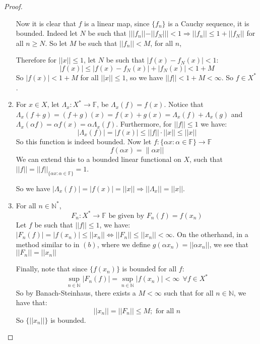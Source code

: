 \documentclass{article}
\newcommand{\N}{\mathbb{N}}
\theoremstyle{definition}
\theoremstyle{remark}
\theoremstyle{definition}
\begin{document}
\begin{proof}
\begin{enumerate}[label = (\alph*)]
    Now it is clear that $f$ is a linear map, since $\{f_n\}$ is a Cauchy sequence, it is bounded. Indeed let $N$
 be such that $|||f_n|| - ||f_N|| |< 1 \Rightarrow ||f_n|| \leq 1+||f_N||$ for all $n\geq N$.
So let $M$ be such that $||f_n||<M$, for all $n$,


Therefore for $||x||\leq 1$, let $N$ be such that $|f(x)-f_N(x)|<1$:\begin{equation}
    |f(x)|\leq |f(x)-f_N(x)|+|f_N(x)| <1+M
\end{equation}
So $|f(x)|<1+M$ for all $||x||\leq 1$, so we have $||f||<1+M<\infty$. So $f\in X^\ast$.

\item For $x\in X$, let $\Lambda_x \colon X^\ast\rightarrow \mathbb{F}$, be $\Lambda_x(f) = f(x)$. 
Notice that $\Lambda_x(f+g) = (f+g)(x) = f(x)+g(x) = \Lambda_x(f)+\Lambda_x(g)$ and $\Lambda_x(\alpha f) = \alpha f(x) = \alpha \Lambda_x(f)$.
Furthermore, for $||f||\leq 1$ we have:\begin{equation}
    |\Lambda_x(f)| = |f(x)| \leq ||f||\cdot ||x|| \leq ||x||
\end{equation}
So this function is indeed bounded. Now let $f\colon \{\alpha x\colon \alpha\in \mathbb{F}\} \rightarrow \mathbb{F}$ \begin{equation}
    f(\alpha x) = \|\alpha x||
\end{equation}
We can extend this to a bounded linear functional on $X$, such that $||f|| = ||f||_{\{\alpha x\colon \alpha\in \mathbb{F}\}} = 1$. 

So we have $|\Lambda_x(f)| = |f(x)| = ||x|| \Rightarrow ||\Lambda_x|| = ||x||$.

\item For all $n\in \N^\ast$, \begin{equation}
    F_n\colon X^\ast \rightarrow \mathbb{F} \text{ be given by }F_n(f) = f(x_n)
\end{equation}
Let $f$ be such that $||f||\leq 1$, we have: $|F_n(f)| = |f(x_n)| \leq ||x_n|| \iff ||F_n|| \leq ||x_n|| <\infty$.
On the otherhand, in a method similar to in $(b)$, where we define $g(\alpha x_n) = ||\alpha x_n||$, we see that $||F_n|| = ||x_n||$

Finally, note that since $\{f(x_n)\}$ is bounded for all $f$: \begin{equation}
    \sup_{n\in \N} |F_n(f)| = \sup_{n\in \N}|f(x_n)|<\infty \  \ \forall f\in X^\ast
\end{equation}
So by Banach-Steinhaus, there exists a $M<\infty$ such that for all $n\in \N$, we have that:\begin{equation}
    ||x_n|| = ||F_n|| \leq M; \text{ for all }n
\end{equation}
So $\{||x_n||\}$ is bounded.
\end{enumerate}
    
\end{proof}
\end{document}
